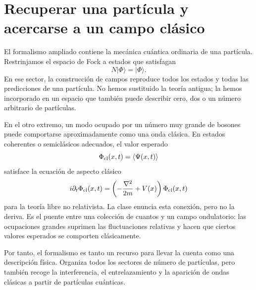\section{Recuperar una partícula y acercarse a un campo clásico}

El formalismo ampliado contiene la mecánica cuántica ordinaria de una partícula. Restrinjamos el espacio de Fock a estados que satisfagan
\begin{equation}
N|\Phi\rangle=|\Phi\rangle.
\end{equation}
En ese sector, la construcción de campos reproduce todos los estados y todas las predicciones de una partícula. No hemos sustituido la teoría antigua; la hemos incorporado en un espacio que también puede describir cero, dos o un número arbitrario de partículas.

En el otro extremo, un modo ocupado por un número muy grande de bosones puede comportarse aproximadamente como una onda clásica. En estados coherentes o semiclásicos adecuados, el valor esperado
\begin{equation}
\Phi_{\rm cl}(x,t)=\langle\Psi(x,t)\rangle
\end{equation}
satisface la ecuación de aspecto clásico
\begin{equation}
i\partial_t\Phi_{\rm cl}(x,t)
=\left(-\frac{\nabla^2}{2m}+V(x)\right)\Phi_{\rm cl}(x,t)
\label{eq:l07-classical-schrodinger}
\end{equation}
para la teoría libre no relativista. La clase enuncia esta conexión, pero no la deriva. Es el puente entre una colección de cuantos y un campo ondulatorio: las ocupaciones grandes suprimen las fluctuaciones relativas y hacen que ciertos valores esperados se comporten clásicamente.

Por tanto, el formalismo es tanto un recurso para llevar la cuenta como una descripción física. Organiza todos los sectores de número de partículas, pero también recoge la interferencia, el entrelazamiento y la aparición de ondas clásicas a partir de partículas cuánticas.

\begin{classroomqa}
\end{classroomqa}

